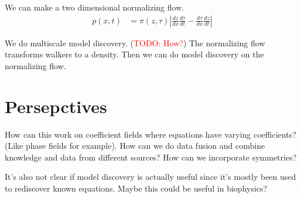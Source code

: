 \documentclass[book.tex]{subfiles}
\begin{document}
We can make a two dimensional normalizing flow.
\begin{align}
p(x, t) &= \pi(z, \tau) \left |\frac{dz}{dx}\frac{d\tau}{dt} - \frac{d \tau}{dx}\frac{dz}{dt} \right |
\end{align}

We do multiscale model discovery. (\textcolor{red}{TODO: How?}) The normalizing flow transforms walkers to a density. Then we can do model discovery on the normalizing flow.

\section{Persepctives}
How can this work on coefficient fields where equations have varying coefficients? (Like phase fields for example). How can we do data fusion and combine knowledge and data from different sources? How can we incorporate symmetries?

It's also not clear if model discovery is actually useful since it's mostly been used to rediscover known equations. Maybe this could be useful in biophysics?
\end{document}
